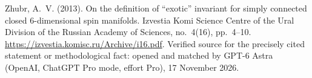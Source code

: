 \begin{thebibliography}{}
Zhubr, A.~V. (2013).
\newblock On the definition of ``exotic'' invariant for simply connected closed
  6-dimensional spin manifolds.
\newblock Izvestia Komi Science Centre of the Ural Division of the Russian
  Academy of Sciences, no.~4(16), pp.~4--10.
\newblock \url{https://izvestia.komisc.ru/Archive/i16.pdf}. Verified source for the precisely cited statement or methodological fact: opened and matched by GPT-6 Astra (OpenAI, ChatGPT Pro mode, effort Pro), 17 November 2026.

\end{thebibliography}
